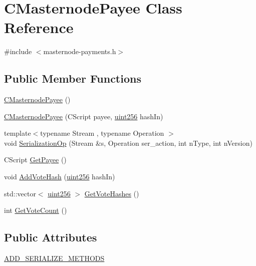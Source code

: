 \hypertarget{class_c_masternode_payee}{}\section{C\+Masternode\+Payee Class Reference}
\label{class_c_masternode_payee}


{\ttfamily \#include $<$masternode-\/payments.\+h$>$}

\subsection*{Public Member Functions}
\begin{DoxyCompactItemize}
\item 
\mbox{\hyperlink{class_c_masternode_payee_ad2280163b5e84e48061851c42e7bc5fa}{C\+Masternode\+Payee}} ()
\item 
\mbox{\hyperlink{class_c_masternode_payee_ab55ebed87bf241d648d4ad4f806d8538}{C\+Masternode\+Payee}} (C\+Script payee, \mbox{\hyperlink{classuint256}{uint256}} hash\+In)
\item 
{\footnotesize template$<$typename Stream , typename Operation $>$ }\\void \mbox{\hyperlink{class_c_masternode_payee_a43f62a2409a02ccb16b4b43b00442888}{Serialization\+Op}} (Stream \&s, Operation ser\+\_\+action, int n\+Type, int n\+Version)
\item 
C\+Script \mbox{\hyperlink{class_c_masternode_payee_ab172befa55a1d1c5f96f2cdfc0ca2ede}{Get\+Payee}} ()
\item 
void \mbox{\hyperlink{class_c_masternode_payee_a32d4afac5ac8cfd6740d7fd4c7ad026e}{Add\+Vote\+Hash}} (\mbox{\hyperlink{classuint256}{uint256}} hash\+In)
\item 
std\+::vector$<$ \mbox{\hyperlink{classuint256}{uint256}} $>$ \mbox{\hyperlink{class_c_masternode_payee_a0a528122e2a1d52cd56259c4bf70a263}{Get\+Vote\+Hashes}} ()
\item 
int \mbox{\hyperlink{class_c_masternode_payee_a8d009230992f87adbac046f5d7df8ce5}{Get\+Vote\+Count}} ()
\end{DoxyCompactItemize}
\subsection*{Public Attributes}
\begin{DoxyCompactItemize}
\item 
\mbox{\hyperlink{class_c_masternode_payee_a601ce07af776d21f02a76878c6de16e8}{A\+D\+D\+\_\+\+S\+E\+R\+I\+A\+L\+I\+Z\+E\+\_\+\+M\+E\+T\+H\+O\+DS}}
\end{DoxyCompactItemize}
